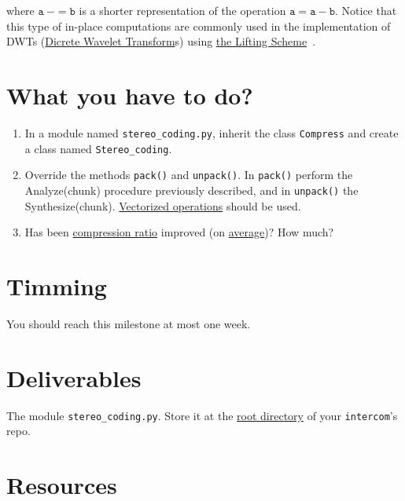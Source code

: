 where $\mathtt{a~-= b}$ is a shorter representation of the operation
$\mathtt{a = a - b}$. Notice that this type of in-place computations
are commonly used in the implementation of DWTs
(\href{https://en.wikipedia.org/wiki/Discrete_wavelet_transform}{Dicrete
  Wavelet Transform}s) using
\href{https://cm-bell-labs.github.io/who/wim/papers/athome/athome.pdf}{the
  Lifting Scheme}~\cite{2006.sweldens}.

\section{What you have to do?}

\begin{enumerate}
\item In a module named \texttt{stereo\_coding.py}, inherit the class
  \texttt{Compress} and create a class named \texttt{Stereo\_coding}.
\item Override the methods \texttt{pack()} and \texttt{unpack()}. In
  \texttt{pack()} perform the Analyze(chunk) procedure previously
  described, and in \texttt{unpack()} the
  Synthesize(chunk). \href{https://www.oreilly.com/library/view/python-for-data/9781449323592/ch04.html}{Vectorized
    operations} should be used.
\item Has been
  \href{https://en.wikipedia.org/wiki/Data_compression_ratio}{compression
    ratio} improved (on
  \href{https://en.wikipedia.org/wiki/Average}{average})? How much?
\end{enumerate}

\section{Timming}

You should reach this milestone at most one week.

\section{Deliverables}

The module \texttt{stereo\_coding.py}. Store
it at the
\href{https://github.com/Tecnologias-multimedia/intercom}{root
  directory} of your \texttt{intercom}'s repo.

\section{Resources}


